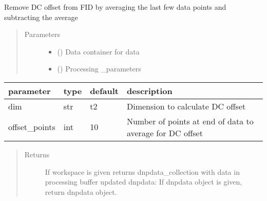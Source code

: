 \documentclass[letterpaper,10pt,english]{sphinxmanual}
\begin{document}
\begin{fulllineitems}
\label{\detokenize{dnpNMR:dnpLab.dnpNMR.remove_offset}}
Remove DC offset from FID by averaging the last few data points and subtracting the average
\begin{quote}\begin{description}
\item[{Parameters}] \leavevmode\begin{itemize}
\item {} 
 ({\hyperref[\detokenize{dnpData:dnpLab.dnpdata}]{}}\sphinxstyleliteralemphasis{\sphinxupquote{, }}) \sphinxhyphen{}\sphinxhyphen{} Data container for data

\item {} 
 (\sphinxstyleliteralemphasis{\sphinxupquote{,}}) \sphinxhyphen{}\sphinxhyphen{} Processing \_parameters

\end{itemize}

\end{description}\end{quote}


\begin{savenotes}\sphinxattablestart
\centering
\begin{tabulary}{\linewidth}[t]{|T|T|T|T|}
\hline

parameter
&
type
&
default
&
description
\\
\hline
dim
&
str
&
\textquotesingle{}t2\textquotesingle{}
&
Dimension to calculate DC offset
\\
\hline
offset\_points
&
int
&
10
&
Number of points at end of data to average for DC offset
\\
\hline
\end{tabulary}
\par
\sphinxattableend\end{savenotes}
\begin{quote}\begin{description}
\item[{Returns}] \leavevmode
If workspace is given returns dnpdata\_collection with data in processing buffer updated
dnpdata: If dnpdata object is given, return dnpdata object.


\end{description}
\end{quote}
\end{fulllineitems}
\end{document}
